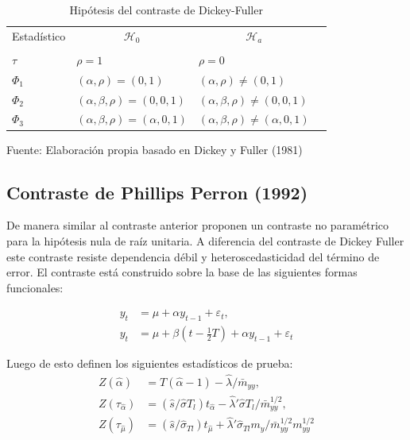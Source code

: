 \documentclass[12pt, twoside]{book}\usepackage[]{graphicx}\usepackage[]{color}
\numberwithin{equation}{section}
\numberwithin{theorem}{section}
\numberwithin{teorema}{section}
\numberwithin{defi}{section}
\numberwithin{prop}{section}
\numberwithin{defi}{section}
\theoremstyle{plain}
\begin{document}
\begin{table}[h]
\centering
\begin{threeparttable}
\caption{Hipótesis del contraste de Dickey-Fuller}
\begin{tabular}{@{}llrllll@{}}
\toprule
\multicolumn{2}{l}{Estadístico} & \multicolumn{2}{c}{$\mathcal{H}_{0}$} &
\multicolumn{2}{c}{$\mathcal{H}_{a}$} \\
\cmidrule(l){3-4} \cmidrule(l){5-6} \\
\multicolumn{2}{l}{$\tau$} & 
\multicolumn{2}{l}{$\rho =1 $} & 
\multicolumn{2}{l}{$\rho =0 $} \\
\multicolumn{2}{l}{$\Phi_{1}$} &
\multicolumn{2}{l}{$(\alpha,\rho)=(0,1)$} &
\multicolumn{2}{l}{$(\alpha,\rho)\neq(0,1)$} \\
\multicolumn{2}{l}{$\Phi_{2}$} &
\multicolumn{2}{l}{$(\alpha,\beta, \rho)=(0,0,1)$} &
\multicolumn{2}{l}{$(\alpha,\beta,\rho)\neq(0,0,1)$} \\
\multicolumn{2}{l}{$\Phi_{3}$} &
\multicolumn{2}{l}{$(\alpha,\beta, \rho)=(\alpha,0,1)$} &
\multicolumn{2}{l}{$(\alpha,\beta,\rho)\neq(\alpha,0,1)$} \\
\bottomrule
\end{tabular}
\label{tab-1}
\begin{tablenotes}
\small
\item Fuente: Elaboración propia basado en Dickey y Fuller (1981)
\end{tablenotes}
\end{threeparttable}
\end{table}

\subsection{Contraste de Phillips Perron (1992)}

De manera similar al contraste anterior \cite{phillips1988} proponen un contraste no paramétrico para la hipótesis nula de raíz unitaria. A diferencia del contraste de Dickey Fuller este contraste resiste dependencia débil y heteroscedasticidad del término de error. El contraste está construido sobre la base de las siguientes formas funcionales: 

\begin{align}
y_{t} & = \mu+\alpha y_{t-1}+\varepsilon_{t}, \\ 
y_{t} & = \mu+\beta\left(t-\frac{1}{2}T\right)+\alpha y_{t-1}+\varepsilon_{t}
\end{align}

Luego de esto definen los siguientes estadísticos de prueba: 
\begin{align}
Z(\hat{\alpha}) & = T(\hat{\alpha}-1)-\hat{\lambda}/\bar{m}_{yy}, \label{eq:pp1}\\ 
Z(\tau_{\hat{\alpha}}) & = (\hat{s}/\hat{\sigma}T_{l})t_{\hat{\alpha}}-\hat{\lambda}'\hat{\sigma}T_{l}/\bar{m}^{1/2}_{yy}, \\ 
Z(\tau_{\hat{\mu}}) & = (\hat{s}/\hat{\sigma}_{Tl})t_{\hat{\mu}}+\hat{\lambda}'\hat{\sigma}_{Tl}m_{y}/\bar{m}^{1/2}_{yy}m^{1/2}_{yy} \label{eq:pp3}
\end{align}
\end{document}
